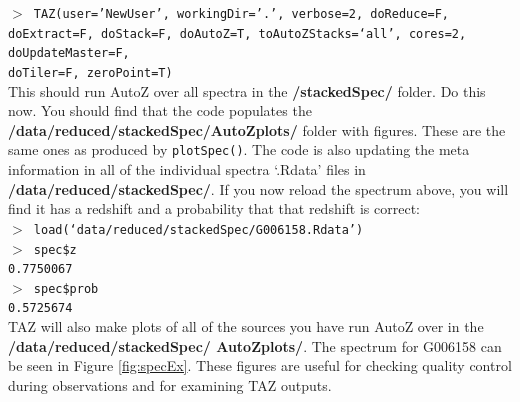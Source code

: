 \documentclass[12pt]{article}
\begin{document}
  \hspace{10mm} \texttt{$>$ TAZ(user='NewUser', workingDir='.', verbose=2, doReduce=F, doExtract=F, doStack=F, doAutoZ=T,  toAutoZStacks=`all',  cores=2, doUpdateMaster=F, \\ doTiler=F, zeroPoint=T)}\\  
  
This should run AutoZ over all spectra in the \textbf{/stackedSpec/} folder. Do this now. You should find that the code populates the \textbf{/data/reduced/stackedSpec/AutoZplots/} folder with figures. These are the same ones as produced by \texttt{plotSpec()}. The code is also updating the meta information in all of the individual spectra `.Rdata' files in \textbf{/data/reduced/stackedSpec/}. If you now reload the spectrum above, you will find it has a redshift and a probability that that redshift is correct:\\  

\hspace{10mm} \texttt{$>$ load(`data/reduced/stackedSpec/G006158.Rdata')} \\

\hspace{10mm} \texttt{$>$ spec\$z} \\

\hspace{10mm} \texttt{0.7750067}\\
 
 \hspace{10mm} \texttt{$>$ spec\$prob} \\
 
 \hspace{10mm} \texttt{0.5725674}\\

TAZ will also make plots of all of the sources you have run AutoZ over in the \textbf{/data/reduced/stackedSpec/ AutoZplots/}. The spectrum for G006158 can be seen in Figure \ref{fig:specEx}. These figures are useful for checking quality control during observations and for examining TAZ outputs.
\end{document}
